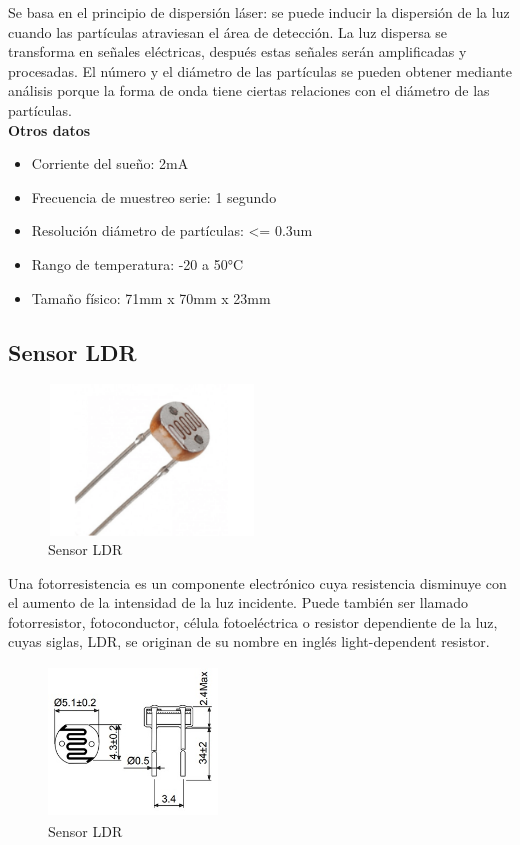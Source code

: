 Se basa en el principio de dispersión láser: se puede inducir la dispersión de la luz cuando las partículas atraviesan el área de detección. La luz dispersa se transforma en señales eléctricas, después estas señales serán amplificadas y procesadas. El número y el diámetro de las partículas se pueden obtener mediante análisis porque la forma de onda tiene ciertas relaciones con el diámetro de las partículas.\\

\textbf{Otros datos}

\begin{itemize}
    \item Corriente del sueño: 2mA
    \item Frecuencia de muestreo serie: 1 segundo
    \item Resolución diámetro de partículas: <= 0.3um
    \item Rango de temperatura: -20 a 50°C
    \item Tamaño físico: 71mm x 70mm x 23mm 
\end{itemize}

\vspace{5cm}

\subsection{Sensor LDR}

\begin{figure}[H]
      \centering
      \includegraphics[width=5.5cm, height=4cm]{imagenes/sensor LDR.png}
      \caption{Sensor LDR}
      \label{imag:LDR}
   \end{figure}

Una fotorresistencia es un componente electrónico cuya resistencia disminuye con el aumento de la intensidad de la luz incidente. Puede también ser llamado fotorresistor, fotoconductor, célula fotoeléctrica o resistor dependiente de la luz, cuyas siglas, LDR, se originan de su nombre en inglés light-dependent resistor.\\

\begin{figure}[H]
    \centering
    \includegraphics[width=4.5cm, height=4cm]{imagenes/ldr.jpg}
    \caption{Sensor LDR}
    \label{imag:dimensiones LDR}
 \end{figure}

